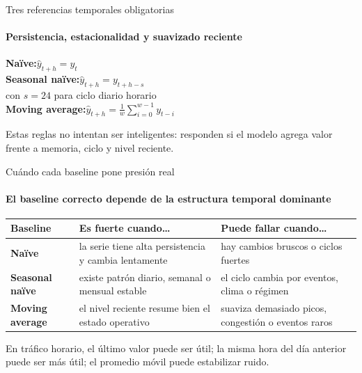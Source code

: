 \documentclass[aspectratio=169,11pt]{beamer}  %
\newcommand{\hrow}{\rowcolor{mlcream}}
\begin{document}

\begin{frame}{Tres referencias temporales obligatorias}
\framesubtitle{Persistencia, estacionalidad y suavizado reciente}
\begin{center}\Large
\textbf{Naïve:}\quad $\hat y_{t+h} = y_t$\\[1em]
\textbf{Seasonal naïve:}\quad $\hat y_{t+h} = y_{t+h-s}$\\
con $s = 24$ para ciclo diario horario\\[0.5em]
\textbf{Moving average:}\quad $\displaystyle \hat y_{t+h} = \frac{1}{w}\sum_{i=0}^{w-1} y_{t-i}$
\end{center}
\vspace{-0.3em}
Estas reglas no intentan ser inteligentes: responden si el modelo agrega valor frente a memoria, ciclo y nivel reciente.
\end{frame}

\begin{frame}{Cuándo cada baseline pone presión real}
\framesubtitle{El baseline correcto depende de la estructura temporal dominante}
\centering
\begin{tabular}{@{}l P{0.35\textwidth} P{0.35\textwidth}@{}}
\toprule
\hrow \textbf{Baseline} & Es fuerte cuando\ldots & Puede fallar cuando\ldots\\
\midrule
\textbf{Naïve} & la serie tiene alta persistencia y cambia lentamente & hay cambios bruscos o ciclos fuertes\\
\textbf{Seasonal naïve} & existe patrón diario, semanal o mensual estable & el ciclo cambia por eventos, clima o régimen\\
\textbf{Moving average} & el nivel reciente resume bien el estado operativo & suaviza demasiado picos, congestión o eventos raros\\
\bottomrule
\end{tabular}

\vspace{1.2em}
En tráfico horario, el último valor puede ser útil; la misma hora del día anterior puede ser más útil; el promedio móvil puede estabilizar ruido.
\end{frame}
\end{document}
